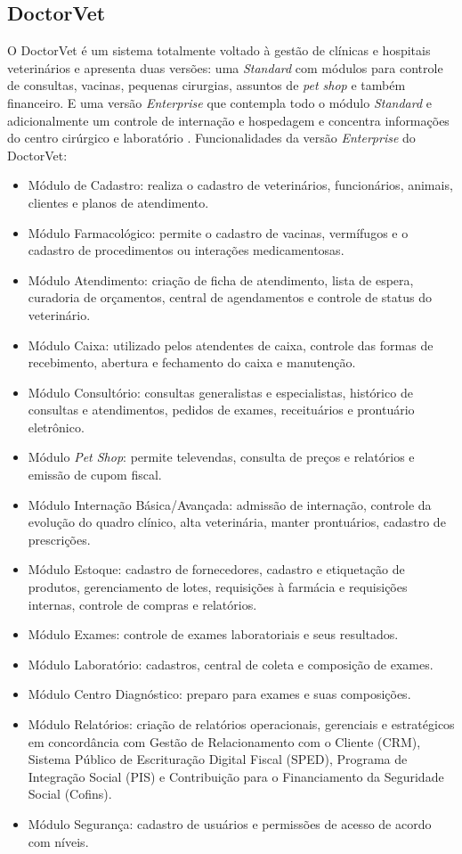 \documentclass[
    12pt,               %
    openright,          %
    oneside,
    a4paper,            %
    BIBLATEX,           %
    TODO,               %
    english,            %
    brazil              %
    ]{ifsp-spo-inf-ctds}
\begin{document}
        \subsection{DoctorVet}
        O DoctorVet é um sistema totalmente voltado à gestão de clínicas e hospitais veterinários e apresenta duas versões: uma \emph{Standard} com módulos para controle de consultas, vacinas, pequenas cirurgias, assuntos de \emph{pet shop} e também financeiro. E uma versão \emph{Enterprise} que contempla todo o módulo \emph{Standard} e adicionalmente um controle de internação e hospedagem e concentra informações do centro cirúrgico e laboratório .  Funcionalidades da versão \emph{Enterprise} do DoctorVet:

\begin{itemize}
    \item Módulo de Cadastro: realiza o cadastro de veterinários, funcionários, animais, clientes e planos de atendimento.
    \item Módulo Farmacológico: permite o cadastro de vacinas, vermífugos e o cadastro de procedimentos ou interações medicamentosas.
    \item Módulo Atendimento: criação de ficha de atendimento, lista de espera, curadoria de orçamentos, central de   agendamentos e controle de status do veterinário.
    \item Módulo Caixa: utilizado pelos atendentes de caixa, controle das formas de recebimento, abertura e fechamento do caixa e manutenção.
    \item Módulo Consultório: consultas generalistas e especialistas, histórico de consultas e atendimentos, pedidos de exames, receituários e prontuário eletrônico.
    \item Módulo \emph{Pet Shop}: permite televendas, consulta de preços e relatórios e emissão de cupom fiscal.
    \item Módulo Internação Básica/Avançada: admissão de internação, controle da evolução do quadro clínico, alta veterinária, manter prontuários, cadastro de prescrições.
    \item Módulo Estoque: cadastro de fornecedores, cadastro e etiquetação de produtos, gerenciamento de lotes, requisições à farmácia e requisições internas, controle de compras e relatórios.
    \item Módulo Exames: controle de exames laboratoriais e seus resultados.
    \item Módulo Laboratório: cadastros, central de coleta e composição de exames.
    \item Módulo Centro Diagnóstico: preparo para exames e suas composições.
    \item Módulo Relatórios: criação de relatórios operacionais, gerenciais e estratégicos em concordância com Gestão de Relacionamento com o Cliente (CRM), Sistema Público de Escrituração Digital Fiscal (SPED), Programa de Integração Social (PIS) e Contribuição para o Financiamento da Seguridade Social (Cofins).
    \item Módulo Segurança: cadastro de usuários e permissões de acesso de acordo com níveis.
\end{itemize}
\end{document}
